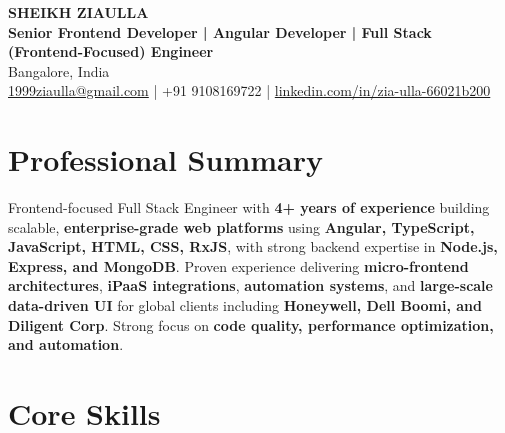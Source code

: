 \documentclass[11pt,a4paper]{article}
\begin{document}
\begin{center}
    {\LARGE \textbf{SHEIKH ZIAULLA}} \\
    \vspace{2pt}
    \textbf{Senior Frontend Developer | Angular Developer | Full Stack (Frontend-Focused) Engineer} \\
    \vspace{4pt}
    Bangalore, India \\
    \href{mailto:1999ziaulla@gmail.com}{1999ziaulla@gmail.com} \;|\;
    +91 9108169722 \;|\;
    \href{https://linkedin.com/in/zia-ulla-66021b200}{linkedin.com/in/zia-ulla-66021b200}
\end{center}

\section*{Professional Summary}
Frontend-focused Full Stack Engineer with \textbf{4+ years of experience} building scalable, \textbf{enterprise-grade web platforms} using \textbf{Angular, TypeScript, JavaScript, HTML, CSS, RxJS}, with strong backend expertise in \textbf{Node.js, Express, and MongoDB}. Proven experience delivering \textbf{micro-frontend architectures}, \textbf{iPaaS integrations}, \textbf{automation systems}, and \textbf{large-scale data-driven UI} for global clients including \textbf{Honeywell, Dell Boomi, and Diligent Corp}. Strong focus on \textbf{code quality, performance optimization, and automation}.

\section*{Core Skills}
\end{document}
